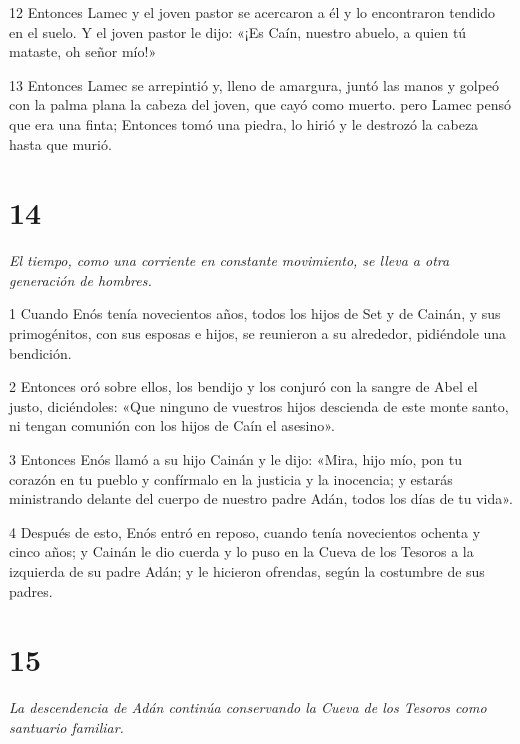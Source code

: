 \par 12 Entonces Lamec y el joven pastor se acercaron a él y lo encontraron tendido en el suelo. Y el joven pastor le dijo: «¡Es Caín, nuestro abuelo, a quien tú mataste, oh señor mío!»

\par 13 Entonces Lamec se arrepintió y, lleno de amargura, juntó las manos y golpeó con la palma plana la cabeza del joven, que cayó como muerto. pero Lamec pensó que era una finta; Entonces tomó una piedra, lo hirió y le destrozó la cabeza hasta que murió.

\chapter{14}

\par \textit{El tiempo, como una corriente en constante movimiento, se lleva a otra generación de hombres.}

\par 1 Cuando Enós tenía novecientos años, todos los hijos de Set y de Cainán, y sus primogénitos, con sus esposas e hijos, se reunieron a su alrededor, pidiéndole una bendición.

\par 2 Entonces oró sobre ellos, los bendijo y los conjuró con la sangre de Abel el justo, diciéndoles: «Que ninguno de vuestros hijos descienda de este monte santo, ni tengan comunión con los hijos de Caín el asesino».

\par 3 Entonces Enós llamó a su hijo Cainán y le dijo: «Mira, hijo mío, pon tu corazón en tu pueblo y confírmalo en la justicia y la inocencia; y estarás ministrando delante del cuerpo de nuestro padre Adán, todos los días de tu vida».

\par 4 Después de esto, Enós entró en reposo, cuando tenía novecientos ochenta y cinco años; y Cainán le dio cuerda y lo puso en la Cueva de los Tesoros a la izquierda de su padre Adán; y le hicieron ofrendas, según la costumbre de sus padres.

\chapter{15}

\par \textit{La descendencia de Adán continúa conservando la Cueva de los Tesoros como santuario familiar.}

